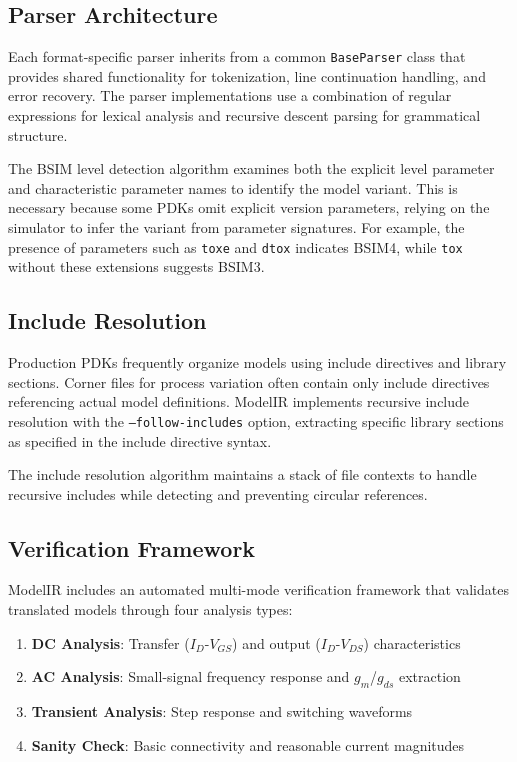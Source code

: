\documentclass[conference]{IEEEtran}
\begin{document}
\subsection{Parser Architecture}

Each format-specific parser inherits from a common \texttt{BaseParser} class that provides shared functionality for tokenization, line continuation handling, and error recovery. The parser implementations use a combination of regular expressions for lexical analysis and recursive descent parsing for grammatical structure.

The BSIM level detection algorithm examines both the explicit level parameter and characteristic parameter names to identify the model variant. This is necessary because some PDKs omit explicit version parameters, relying on the simulator to infer the variant from parameter signatures. For example, the presence of parameters such as \texttt{toxe} and \texttt{dtox} indicates BSIM4, while \texttt{tox} without these extensions suggests BSIM3.

\subsection{Include Resolution}

Production PDKs frequently organize models using include directives and library sections. Corner files for process variation often contain only include directives referencing actual model definitions. ModelIR implements recursive include resolution with the \texttt{--follow-includes} option, extracting specific library sections as specified in the include directive syntax.

The include resolution algorithm maintains a stack of file contexts to handle recursive includes while detecting and preventing circular references.

\subsection{Verification Framework}

ModelIR includes an automated multi-mode verification framework that validates translated models through four analysis types:

\begin{enumerate}
\item \textbf{DC Analysis}: Transfer ($I_D$-$V_{GS}$) and output ($I_D$-$V_{DS}$) characteristics
\item \textbf{AC Analysis}: Small-signal frequency response and $g_m$/$g_{ds}$ extraction
\item \textbf{Transient Analysis}: Step response and switching waveforms
\item \textbf{Sanity Check}: Basic connectivity and reasonable current magnitudes
\end{enumerate}
\end{document}
